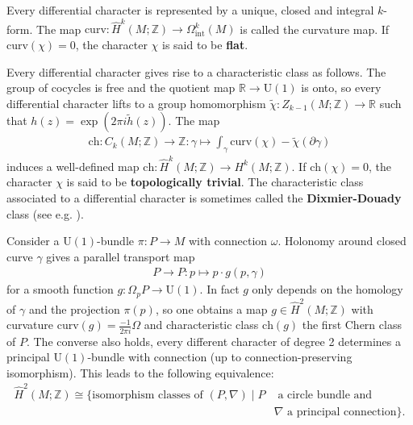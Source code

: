     \begin{property}[Curvature]
        Every differential character is represented by a unique, closed and integral $k$-form. The map $\mathrm{curv}:\hat{H}^k(M;\mathbb{Z})\rightarrow\Omega^k_\mathrm{int}(M)$ is called the curvature map. If $\mathrm{curv}(\chi)=0$, the character $\chi$ is said to be \textbf{flat}.
    \end{property}

    \begin{property}
        Every differential character gives rise to a characteristic class as follows. The group of cocycles is free and the quotient map $\mathbb{R}\rightarrow\mathrm{U}(1)$ is onto, so every differential character lifts to a group homomorphism $\widetilde{\chi}:Z_{k-1}(M;\mathbb{Z})\rightarrow\mathbb{R}$ such that $h(z)=\exp(2\pi i\widetilde{h}(z))$. The map
        \begin{gather}
            \mathrm{ch}:C_k(M;\mathbb{Z})\rightarrow\mathbb{Z}:\gamma\mapsto\int_\gamma\mathrm{curv}(\chi)-\widetilde{\chi}(\partial\gamma)
        \end{gather}
        induces a well-defined map $\mathrm{ch}:\hat{H}^k(M;\mathbb{Z})\rightarrow H^k(M;\mathbb{Z})$. If $\mathrm{ch}(\chi)=0$, the character $\chi$ is said to be \textbf{topologically trivial}. The characteristic class associated to a differential character is sometimes called the \textbf{Dixmier-Douady} class (see e.g. \cite{brylinski}).
    \end{property}

    \begin{example}
        Consider a $\mathrm{U}(1)$-bundle $\pi:P\rightarrow M$ with connection $\omega$. Holonomy around closed curve $\gamma$ gives a parallel transport map
        \begin{gather}
            P\rightarrow P:p\mapsto p\cdot g(p,\gamma)
        \end{gather}
        for a smooth function $g:\Omega_p P\rightarrow\mathrm{U}(1)$. In fact $g$ only depends on the homology of $\gamma$ and the projection $\pi(p)$, so one obtains a map $g\in\hat{H}^2(M;\mathbb{Z})$ with curvature $\mathrm{curv}(g)=\frac{-1}{2\pi i}\Omega$ and characteristic class $\mathrm{ch}(g)$ the first Chern class of $P$. The converse also holds, every different character of degree 2 determines a principal $\text{U}(1)$-bundle with connection (up to connection-preserving isomorphism). This leads to the following equivalence:
        \begin{align}
            \hat{H}^2(M;\mathbb{Z})\cong\{\text{isomorphism classes of }(P,\nabla)\mid P&\text{ a circle bundle and }\\
            &\nabla\text{ a principal connection}\}.\nonumber
        \end{align}
    \end{example}

